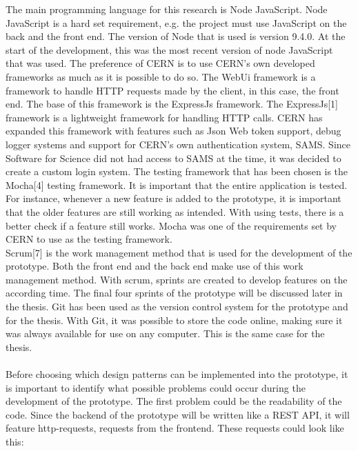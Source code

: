 \documentclass[paper=a4, fontsize=11pt,twoside]{scrartcl}	%
\begin{document}
The main programming language for this research is Node JavaScript. Node JavaScript is a hard set requirement, e.g. the project must use JavaScript on the back and the front end. The version of Node that is used is version 9.4.0. At the start of the development, this was the most recent version of node JavaScript that was used. The preference of CERN is to use CERN's own developed frameworks as much as it is possible to do so. The WebUi framework is a framework to handle HTTP requests made by the client, in this case, the front end. The base of this framework is the ExpressJs framework. The ExpressJs[1] framework is a lightweight framework for handling HTTP calls. CERN has expanded this framework with features such as Json Web token support, debug logger systems and support for CERN's own authentication system, SAMS. Since Software for Science did not had access to SAMS at the time, it was decided to create a custom login system. The testing framework that has been chosen is the Mocha[4] testing framework. It is important that the entire application is tested. For instance, whenever a new feature is added to the prototype, it is important that the older features are still working as intended. With using tests, there is a better check if a feature still works. Mocha was one of the requirements set by CERN to use as the testing framework. \\
Scrum[7] is the work management method that is used for the development of the prototype. Both the front end and the back end make use of this work management method. With scrum, sprints are created to develop features on the according time. The final four sprints of the prototype will be discussed later in the thesis.  
Git has been used as the version control system for the prototype and for the thesis. With Git, it was possible to store the code online, making sure it was always available for use on any computer. This is the same case for the thesis.
\\ \\
Before choosing which design patterns can be implemented into the prototype, it is important to identify what possible problems could occur during the development of the prototype. The first problem could be the readability of the code. Since the backend of the prototype will be written like a REST API, it will feature http-requests, requests from the frontend. These requests could look like this:
\end{document}
